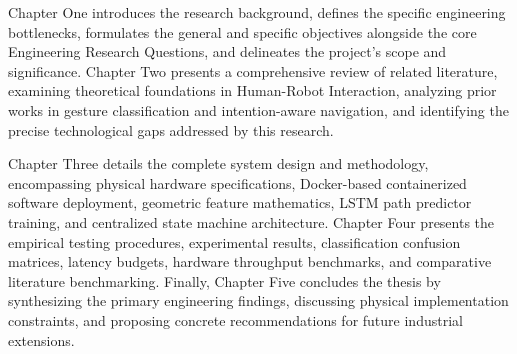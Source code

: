 Chapter One introduces the research background, defines the specific engineering bottlenecks, formulates the general and specific objectives alongside the core Engineering Research Questions, and delineates the project's scope and significance. Chapter Two presents a comprehensive review of related literature, examining theoretical foundations in Human-Robot Interaction, analyzing prior works in gesture classification and intention-aware navigation, and identifying the precise technological gaps addressed by this research. 

Chapter Three details the complete system design and methodology, encompassing physical hardware specifications, Docker-based containerized software deployment, geometric feature mathematics, LSTM path predictor training, and centralized state machine architecture. Chapter Four presents the empirical testing procedures, experimental results, classification confusion matrices, latency budgets, hardware throughput benchmarks, and comparative literature benchmarking. Finally, Chapter Five concludes the thesis by synthesizing the primary engineering findings, discussing physical implementation constraints, and proposing concrete recommendations for future industrial extensions.
